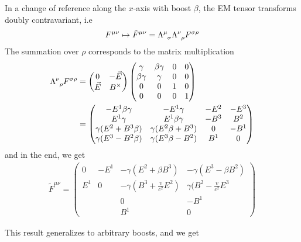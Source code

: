 \begin{ex}
  In a change of reference along the $x$-axis with boost $\beta$, the EM tensor transforms doubly contravariant, i.e
  \begin{align*}
    F^{\mu \nu} \mapsto  \tilde{F}^{\mu \nu} = \tensor{\Lambda}{^{\mu}_{\sigma}} \tensor{\Lambda}{^\nu_\rho} F^{\sigma \rho}
  \end{align*}
  The summation over $\rho$ corresponds to the matrix multiplication 
  \begin{align*}
    \tensor{\Lambda}{^{\nu}_{\rho}} F^{\sigma \rho}
    &=
    \begin{pmatrix}
    0 & -\vec{E}\\
    \vec{E} & B^{\times}
    \end{pmatrix}
    \begin{pmatrix}
    \gamma & \beta \gamma & 0 & 0\\
    \beta \gamma & \gamma & 0 & 0\\
    0 & 0 & 1 & 0\\
    0 & 0 & 0 & 1
    \end{pmatrix}\\
    &=
    \begin{pmatrix}
     -E^{1} \beta \gamma & - E^{1} \gamma &  -E^{2} & -E^{3} \\
     E^{1} \gamma & E^{1} \beta \gamma & -B^{3} & B^{2}\\
     \gamma(E^{2} + B^{3} \beta) & \gamma(E^{2} \beta + B^{3}) & 0 & -B^{1} \\
     \gamma(E^{3} - B^{2} \beta) & \gamma(E ^{3} \beta - B^{2}) & B^{1} & 0 
    \end{pmatrix}
  \end{align*}
  and in the end, we get
  \begin{align*}
    \tilde{F}^{\mu \nu} 
    =
    \begin{pmatrix}
      0 & - E^{1} & -\gamma(E^{2} + \beta B^{3}) & -\gamma(E^{3} - \beta B^{2})\\
      E^{1} & 0 & - \gamma (B^{3} + \frac{v}{c^{2}} E^{2}) & \gamma(B^{2} - \frac{v}{c^{2}} E^{3}\\
     &  & 0 & -B^{1} \\
     &  & B^{1} & 0 
    \end{pmatrix}
  \end{align*}
\end{ex}

This result generalizes to arbitrary boosts, and we get

